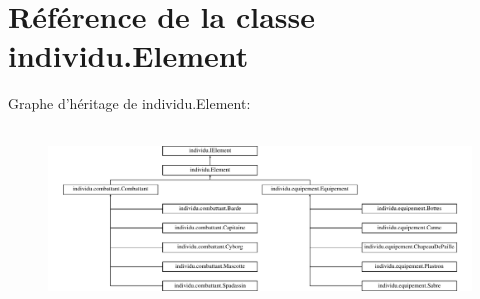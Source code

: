 \hypertarget{classindividu_1_1_element}{\section{Référence de la classe individu.\-Element}
\label{classindividu_1_1_element}
}
Graphe d'héritage de individu.\-Element\-:\begin{figure}[H]
\begin{center}
\leavevmode
\includegraphics[height=4.806867cm]{classindividu_1_1_element}
\end{center}
\end{figure}

